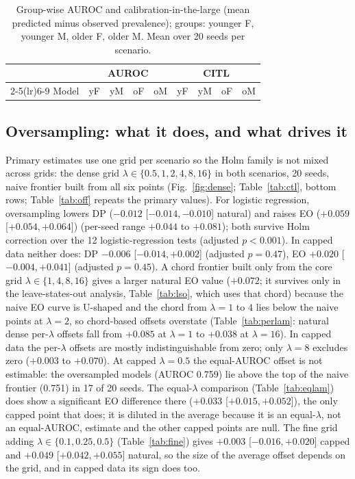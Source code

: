 \begin{table}[t]
\centering
\caption{Group-wise AUROC and calibration-in-the-large (mean predicted minus observed prevalence); groups: younger F, younger M, older F, older M. Mean over 20 seeds per scenario.}
\label{tab:grp}
\scriptsize
\setlength{\tabcolsep}{2.5pt}
\begin{tabular}{lcccccccc}
\toprule
& \multicolumn{4}{c}{AUROC} & \multicolumn{4}{c}{CITL}\\
\cmidrule(lr){2-5}\cmidrule(lr){6-9}
Model & yF & yM & oF & oM & yF & yM & oF & oM\\
\midrule

\bottomrule
\end{tabular}
\end{table}

\subsection{Oversampling: what it does, and what drives it}
\label{sec:over}
Primary estimates use one grid per scenario so the Holm family is not mixed across grids: the dense grid $\lambda\in\{0.5,1,2,4,8,16\}$ in both scenarios, 20 seeds, naive frontier built from all six points (Fig.~\ref{fig:dense}; Table~\ref{tab:ctl}, bottom rows; Table~\ref{tab:off} repeats the primary values). For logistic regression, oversampling lowers DP ($-0.012$ [$-0.014,-0.010$] natural) and raises EO ($+0.059$ [$+0.054,+0.064$]) (per-seed range $+0.044$ to $+0.081$); both survive Holm correction over the 12 logistic-regression tests (adjusted $p<0.001$). In capped data neither does: DP $-0.006$ [$-0.014,+0.002$] (adjusted $p=0.47$), EO $+0.020$ [$-0.004,+0.041$] (adjusted $p=0.45$). A chord frontier built only from the core grid $\lambda\in\{1,4,8,16\}$ gives a larger natural EO value ($+0.072$; it survives only in the leave-states-out analysis, Table~\ref{tab:lso}, which uses that chord) because the naive EO curve is U-shaped and the chord from $\lambda{=}1$ to $4$ lies below the naive points at $\lambda{=}2$, so chord-based offsets overstate (Table~\ref{tab:perlam}: natural dense per-$\lambda$ offsets fall from $+0.085$ at $\lambda{=}1$ to $+0.038$ at $\lambda{=}16$). In capped data the per-$\lambda$ offsets are mostly indistinguishable from zero; only $\lambda{=}8$ excludes zero ($+0.003$ to $+0.070$). At capped $\lambda{=}0.5$ the equal-AUROC offset is not estimable: the oversampled models (AUROC 0.759) lie above the top of the naive frontier (0.751) in 17 of 20 seeds. The equal-$\lambda$ comparison (Table~\ref{tab:eqlam}) does show a significant EO difference there ($+0.033$ [$+0.015,+0.052$]), the only capped point that does; it is diluted in the average because it is an equal-$\lambda$, not an equal-AUROC, estimate and the other capped points are null. The fine grid adding $\lambda\in\{0.1,0.25,0.5\}$ (Table~\ref{tab:fine}) gives $+0.003$ [$-0.016,+0.020$] capped and $+0.049$ [$+0.042,+0.055$] natural, so the size of the average offset depends on the grid, and in capped data its sign does too.

